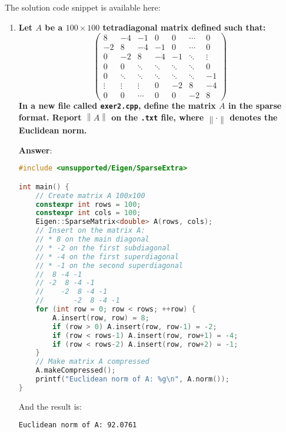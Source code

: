 The solution code snippet is available here:
\begin{center}
\end{center}
\begin{enumerate}[label=\textcolor{Green3}{\textbf{\arabic*.}}]
    \item \textcolor{Green3}{\textbf{%
        Let $A$ be a $100 \times 100$ tetradiagonal matrix defined such that:
    }
    \begin{equation*}
        \begin{pmatrix}
            8 & -4 & -1 & 0 & 0 & \cdots & 0 \\
            -2 & 8 & -4 & -1 & 0 & \cdots & 0 \\
            0 & -2 & 8 & -4 & -1 & \ddots & \vdots \\
            0 & 0 & \ddots & \ddots & \ddots & \ddots & 0 \\
            0 & \ddots & \ddots & \ddots & \ddots & \ddots & -1 \\
            \vdots & \vdots & \vdots & 0 & -2 & 8 & -4 \\
            0 & 0 & \cdots & 0 & 0 & -2 & 8
        \end{pmatrix}
    \end{equation*}
    \textbf{In a new file called \texttt{exer2.cpp}, define the matrix $A$ in the sparse format. Report $\left\| A \right\|$ on the \texttt{.txt} file, where $\left\| \cdot \right\|$ denotes the Euclidean norm.}}

    \textbf{Answer}:
    \begin{lstlisting}[language=C++]
#include <unsupported/Eigen/SparseExtra>

int main() {
    // Create matrix A 100x100
    constexpr int rows = 100;
    constexpr int cols = 100;
    Eigen::SparseMatrix<double> A(rows, cols);
    // Insert on the matrix A:
    // * 8 on the main diagonal
    // * -2 on the first subdiagonal
    // * -4 on the first superdiagonal
    // * -1 on the second superdiagonal
    //  8 -4 -1
    // -2  8 -4 -1
    //    -2  8 -4 -1
    //       -2  8 -4 -1
    for (int row = 0; row < rows; ++row) {
        A.insert(row, row) = 8;
        if (row > 0) A.insert(row, row-1) = -2;
        if (row < rows-1) A.insert(row, row+1) = -4;
        if (row < rows-2) A.insert(row, row+2) = -1;
    }
    // Make matrix A compressed
    A.makeCompressed();
    printf("Euclidean norm of A: %g\n", A.norm());
}\end{lstlisting}
    And the result is:
    \begin{lstlisting}
Euclidean norm of A: 92.0761\end{lstlisting}



\end{enumerate}
